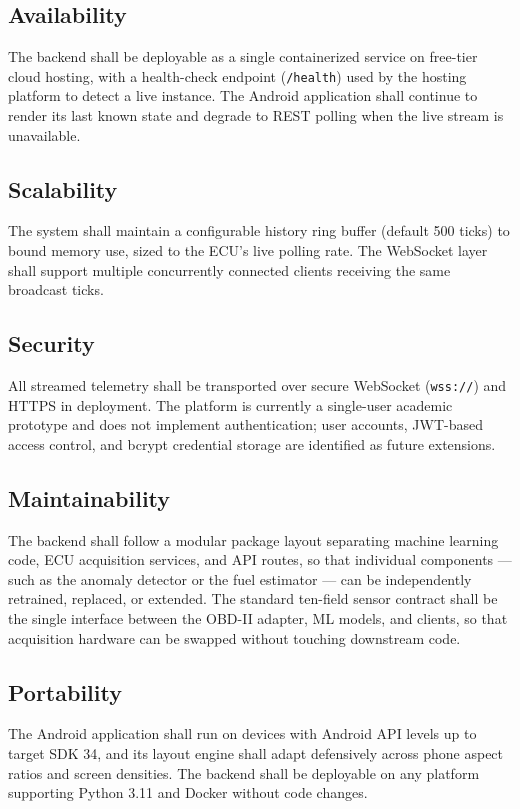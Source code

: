 \documentclass[10pt,a4paper]{report}
\begin{document}
\subsection{Availability}
The backend shall be deployable as a single containerized service on free-tier cloud hosting, with a health-check endpoint (\texttt{/health}) used by the hosting platform to detect a live instance. The Android application shall continue to render its last known state and degrade to REST polling when the live stream is unavailable. \par

\subsection{Scalability}
The system shall maintain a configurable history ring buffer (default 500 ticks) to bound memory use, sized to the ECU's live polling rate. The WebSocket layer shall support multiple concurrently connected clients receiving the same broadcast ticks. \par

\subsection{Security}
All streamed telemetry shall be transported over secure WebSocket (\texttt{wss://}) and HTTPS in deployment. The platform is currently a single-user academic prototype and does not implement authentication; user accounts, JWT-based access control, and bcrypt credential storage are identified as future extensions. \par

\subsection{Maintainability}
The backend shall follow a modular package layout separating machine learning code, ECU acquisition services, and API routes, so that individual components — such as the anomaly detector or the fuel estimator — can be independently retrained, replaced, or extended. The standard ten-field sensor contract shall be the single interface between the OBD-II adapter, ML models, and clients, so that acquisition hardware can be swapped without touching downstream code. \par

\subsection{Portability}
The Android application shall run on devices with Android API levels up to target SDK 34, and its layout engine shall adapt defensively across phone aspect ratios and screen densities. The backend shall be deployable on any platform supporting Python 3.11 and Docker without code changes. \par
\end{document}
